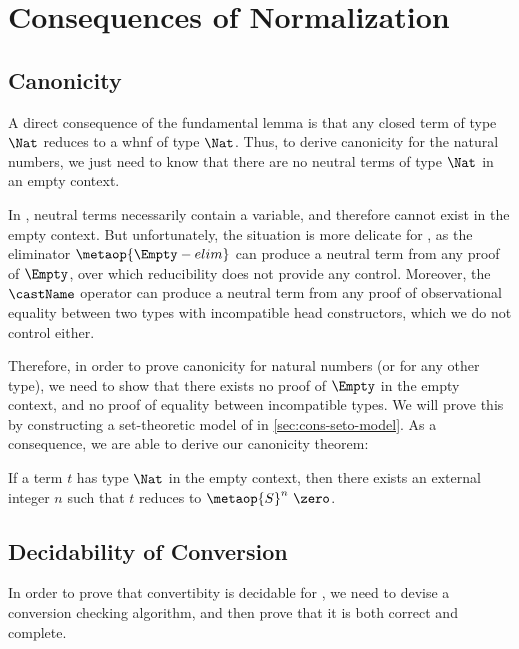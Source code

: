 \section{Consequences of Normalization}
\label{sec:normalization-consequences}

\subsection{Canonicity}

A direct consequence of the fundamental lemma is that any closed
term of type $\Nat$ reduces to a whnf of type $\Nat$. Thus, to
derive canonicity for the natural numbers, we just need to know that there are
no neutral terms of type $\Nat$ in an empty context.

In \MLTT, neutral terms necessarily contain a variable, and therefore cannot 
exist in the empty context. 
% 
But unfortunately, the situation is more delicate for \SetoidCC, as
the eliminator \( \metaop{\Empty-elim} \) can produce a neutral term from any 
proof of \( \Empty \), over which reducibility does not provide any control.
% 
Moreover, the \( \castName \) operator can produce a neutral term from any
proof of observational equality between two types with incompatible head 
constructors, which we do not control either.

Therefore, in order to prove canonicity for natural numbers (or for any other 
type), we need to show that there exists no proof of \( \Empty \) in the empty
context, and no proof of equality between incompatible types.
%
We will prove this by constructing a set-theoretic model of \SetoidCC in 
\cref{sec:cons-seto-model}. As a consequence, we are able to derive our 
canonicity theorem:

\begin{theorem}
	If a term \( t \) has type \( \Nat \) in the empty context, then there 
	exists an external integer \( n \) such that \( t \) reduces to 
  \( \metaop{S}^n\ \zero \).
\end{theorem}

\subsection{Decidability of Conversion}

In order to prove that convertibity is decidable for \SetoidCC, we need to 
devise a conversion checking algorithm, and then prove that it is both
correct and complete.

